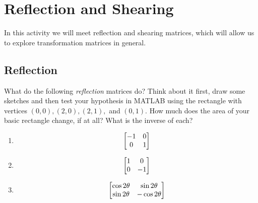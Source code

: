 \section{Reflection and Shearing}

In this activity we will meet reflection and shearing matrices, which will allow us to explore transformation matrices in general.

\subsection{Reflection}

\begin{prob}
What do the following \textit{reflection} matrices do? Think about it first, draw some sketches and then test your hypothesis in MATLAB using the rectangle with vertices $(0,0), (2,0), (2,1),$ and $(0,1)$. How much does the area of your basic rectangle change, if at all? What is the inverse of each?
\begin{enumerate}
\item \[ \begin{bmatrix} -1 & 0 \\ 0 & 1\end{bmatrix} \]
\item \[ \begin{bmatrix} 1 & 0 \\ 0 & -1\end{bmatrix} \]
\item \[ \begin{bmatrix} \cos 2\theta & \sin 2\theta \\ \sin 2\theta & -\cos 2\theta\end{bmatrix} \]
\end{enumerate}
\end{prob}
